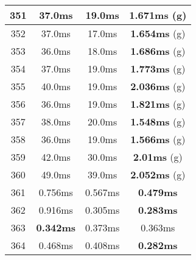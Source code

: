 \begin{table}[H]
\begin{minipage}{5cm}
{\begin{tabular}{|c|c|c|c|}
\hline
351 & 37.0ms & 19.0ms & \textbf{1.671ms} (g) \\
\hline
352 & 37.0ms & 17.0ms & \textbf{1.654ms} (g) \\
\hline
353 & 36.0ms & 18.0ms & \textbf{1.686ms} (g) \\
\hline
354 & 37.0ms & 19.0ms & \textbf{1.773ms} (g) \\
\hline
355 & 40.0ms & 19.0ms & \textbf{2.036ms} (g) \\
\hline
356 & 36.0ms & 19.0ms & \textbf{1.821ms} (g) \\
\hline
357 & 38.0ms & 20.0ms & \textbf{1.548ms} (g) \\
\hline
358 & 36.0ms & 19.0ms & \textbf{1.566ms} (g) \\
\hline
359 & 42.0ms & 30.0ms & \textbf{2.01ms} (g) \\
\hline
360 & 49.0ms & 39.0ms & \textbf{2.052ms} (g) \\
\hline
361 & 0.756ms & 0.567ms & \textbf{0.479ms} \\
\hline
362 & 0.916ms & 0.305ms & \textbf{0.283ms} \\
\hline
363 & \textbf{0.342ms} & 0.373ms & 0.363ms \\
\hline
364 & 0.468ms & 0.408ms & \textbf{0.282ms} \\
\hline
\end{tabular}
}
\end{minipage}
\end{table}

\begin{table}[H]
\begin{minipage}{5cm} 
\end{minipage}
\caption{Tempi di esecuzione in millisecondi dei problemi Disjunctive Binding di Vampire, 1b naif e 1b}
\label{tab:fof_db_time}
\end{table}
